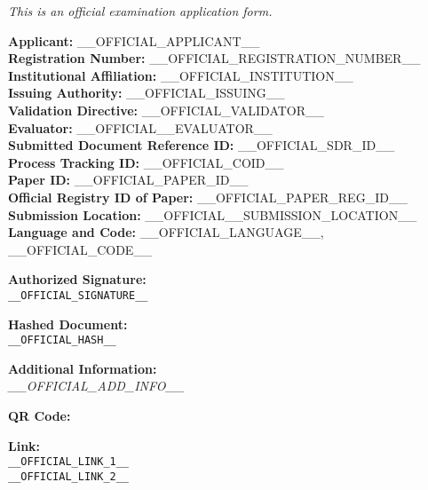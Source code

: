 \begin{tcolorbox}[colback=white, colframe=black, boxrule=0.5pt]

{
\textit{This is an official examination application form.} \hfill 
}

\begin{multicols}{2}
\textbf{Applicant:} __OFFICIAL_APPLICANT__ \hfill  \\
\textbf{Registration Number:} __OFFICIAL_REGISTRATION_NUMBER__ \\
\textbf{Institutional Affiliation:} __OFFICIAL_INSTITUTION__ \\
\textbf{Issuing Authority:} __OFFICIAL_ISSUING__ \\
\textbf{Validation Directive:} __OFFICIAL_VALIDATOR__ \\
\textbf{Evaluator:} __OFFICIAL__EVALUATOR__ \\
\textbf{Submitted Document Reference ID:} __OFFICIAL_SDR_ID__ \\

\textbf{Process Tracking ID:} __OFFICIAL_COID__ \\
\textbf{Paper ID:} __OFFICIAL_PAPER_ID__ \\
\textbf{Official Registry ID of Paper:} __OFFICIAL_PAPER_REG_ID__ \\
\textbf{Submission Location:} __OFFICIAL__SUBMISSION_LOCATION__ \hfill  \\
\textbf{Language and Code:} __OFFICIAL_LANGUAGE__, __OFFICIAL_CODE__ \\
\end{multicols}

\vspace{0.3cm}

\noindent
\textbf{Authorized Signature:} \\
\footnotesize
\texttt{__OFFICIAL_SIGNATURE__}%
\hfill%
\raisebox{-0.1\baselineskip}{}

\vspace{0.3cm}

\normalsize
\textbf{Hashed Document:} \\
\footnotesize
\texttt{__OFFICIAL_HASH__}%
\hfill%
\raisebox{-0.1\baselineskip}{}

\vspace{0.3cm}
\normalsize
\textbf{Additional Information:} \\
\footnotesize
\textit{__OFFICIAL_ADD_INFO__}
\vspace{0.5cm}

\noindent
\textbf{QR Code:} \\

\vspace{0.5cm}

\noindent
\textbf{Link:} \\
\texttt{__OFFICIAL_LINK_1__} \\
\texttt{__OFFICIAL_LINK_2__} \\

\end{tcolorbox}